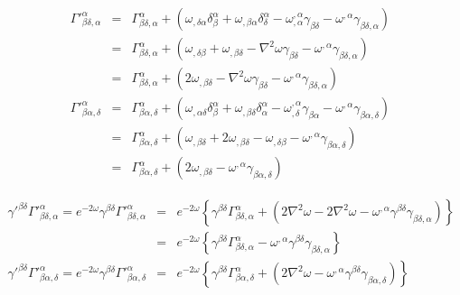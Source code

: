 \documentclass[aps,preprint,preprintnumbers,nofootinbib,showpacs,prd]{revtex4-1}
\newcommand{\nbea}{\begin{eqnarray*}}
\newcommand{\neea}{\end{eqnarray*}}
\begin{document}
%
\nbea
\Gamma'^\alpha_{\beta\delta,\alpha} & = & \Gamma^\alpha_{\beta\delta,\alpha} + \left ( \omega_{,\delta\alpha} \delta^\alpha_\beta + \omega_{,\beta\alpha}\delta^\alpha_\delta - \omega^{,\alpha}_{,\alpha} \gamma_{\beta\delta} - \omega^{,\alpha} \gamma_{\beta\delta,\alpha} \right ) \\
& = & \Gamma^\alpha_{\beta\delta,\alpha} + \left ( \omega_{,\delta\beta} + \omega_{,\beta\delta} - \nabla^2\omega \gamma_{\beta\delta} - \omega^{,\alpha} \gamma_{\beta\delta,\alpha} \right ) \\
& = & \Gamma^\alpha_{\beta\delta,\alpha} + \left ( 2\omega_{,\beta\delta} - \nabla^2\omega \gamma_{\beta\delta} - \omega^{,\alpha} \gamma_{\beta\delta,\alpha} \right ) \\
\Gamma'^\alpha_{\beta\alpha,\delta} & = & \Gamma^\alpha_{\beta\alpha,\delta} + \left ( \omega_{,\alpha\delta} \delta^\alpha_\beta + \omega_{,\beta\delta}\delta^\alpha_\alpha - \omega^{,\alpha}_{,\delta} \gamma_{\beta\alpha} - \omega^{,\alpha} \gamma_{\beta\alpha,\delta} \right ) \\
& = & \Gamma^\alpha_{\beta\alpha,\delta} + \left ( \omega_{,\beta\delta} + 2\omega_{,\beta\delta} - \omega_{,\delta\beta} - \omega^{,\alpha} \gamma_{\beta\alpha,\delta} \right ) \\
& = & \Gamma^\alpha_{\beta\alpha,\delta} + \left ( 2\omega_{,\beta\delta} - \omega^{,\alpha} \gamma_{\beta\alpha,\delta} \right )
\neea
%

%
\nbea
\gamma'^{\beta\delta} \Gamma'^\alpha_{\beta\delta,\alpha} = e^{-2\omega}\gamma^{\beta\delta} \Gamma'^\alpha_{\beta\delta,\alpha} & = & e^{-2\omega} \left \{ \gamma^{\beta\delta}\Gamma^\alpha_{\beta\delta,\alpha} + \left ( 2 \nabla^2\omega - 2 \nabla^2\omega - \omega^{,\alpha} \gamma^{\beta\delta} \gamma_{\beta\delta,\alpha} \right ) \right \}\\
& = & e^{-2\omega} \left \{ \gamma^{\beta\delta}\Gamma^\alpha_{\beta\delta,\alpha} - \omega^{,\alpha} \gamma^{\beta\delta} \gamma_{\beta\delta,\alpha} \right \}\\
\gamma'^{\beta\delta} \Gamma'^\alpha_{\beta\alpha,\delta} = e^{-2\omega}\gamma^{\beta\delta} \Gamma'^\alpha_{\beta\alpha,\delta}  & = & e^{-2\omega} \left \{ \gamma^{\beta\delta} \Gamma^\alpha_{\beta\alpha,\delta} + \left ( 2\nabla^2\omega - \omega^{,\alpha} \gamma^{\beta\delta}\gamma_{\beta\alpha,\delta} \right ) \right \}
\neea
%
\end{document}
